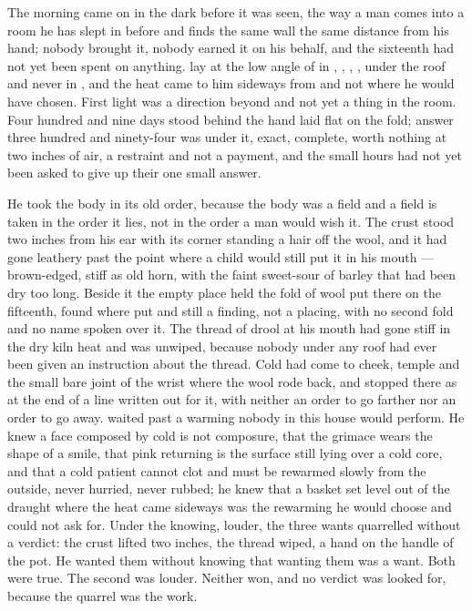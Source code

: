 
The morning came on in the dark before it was seen, the way a man comes into a room he has slept in before and finds the same wall the same distance from his hand; nobody brought it, nobody earned it on his behalf, and the sixteenth had not yet been spent on anything.  lay at the low angle of  in , , , , under the roof and never in , and the heat came to him sideways from  and not where he would have chosen. First light was a direction beyond  and not yet a thing in the room. Four hundred and nine days stood behind the hand laid flat on the fold; answer three hundred and ninety-four was under it, exact, complete, worth nothing at two inches of air, a restraint and not a payment, and the small hours had not yet been asked to give up their one small answer.

He took the body in its old order, because the body was a field and a field is taken in the order it lies, not in the order a man would wish it. The crust stood two inches from his ear with its corner standing a hair off the wool, and it had gone leathery past the point where a child would still put it in his mouth --- brown-edged, stiff as old horn, with the faint sweet-sour of barley that had been dry too long. Beside it the empty place held the fold of wool put there on the fifteenth, found where put and still a finding, not a placing, with no second fold and no name spoken over it. The thread of drool at his mouth had gone stiff in the dry kiln heat and was unwiped, because nobody under any roof had ever been given an instruction about the thread. Cold had come to cheek, temple and the small bare joint of the wrist where the wool rode back, and stopped there as at the end of a line written out for it, with neither an order to go farther nor an order to go away.  waited past a warming nobody in this house would perform. He knew a face composed by cold is not composure, that the grimace wears the shape of a smile, that pink returning is the surface still lying over a cold core, and that a cold patient cannot clot and must be rewarmed slowly from the outside, never hurried, never rubbed; he knew that a basket set level out of the draught where the heat came sideways was the rewarming he would choose and could not ask for. Under the knowing, louder, the three wants quarrelled without a verdict: the crust lifted two inches, the thread wiped, a hand on the handle of the pot. He wanted them without knowing that wanting them was a want. Both were true. The second was louder. Neither won, and no verdict was looked for, because the quarrel was the work.


